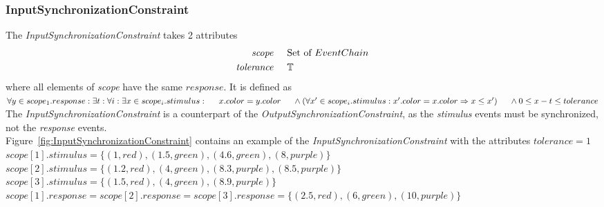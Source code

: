 	\subsubsection{InputSynchronizationConstraint}
	The \emph{InputSynchronizationConstraint} takes 2 attributes
	\begin{align*}
		\emph{scope} 	& \hspace{.5cm} \text{Set of }EventChain\\
		\emph{tolerance}& \hspace{.5cm} \mathbb{T}
	\end{align*}
	where all elements of \emph{scope} have the same $response$. It is defined as \\[10pt]
	\begin{math}
		\forall y\in scope_1.response: \exists t: \forall i: \exists x\in scope_i.stimulus:\\
		\text{\hspace{.5cm}} x.color = y.color\\
		\text{\hspace{.5cm}}\land (\forall x'\in scope_i.stimulus: x'.color=x.color \Rightarrow x\leq x')\\
		\text{\hspace{.5cm}}\land 0\leq x-t\leq tolerance
	\end{math}\\[10pt]
	The \emph{InputSynchronizationConstraint} is a counterpart of the \emph{OutputSynchronizationConstraint}, as the \emph{stimulus} events must be synchronized, not the \emph{response} events.\\
	Figure~\ref{fig:InputSynchronizationConstraint} contains an example of the \emph{InputSynchronizationConstraint} with the attributes $tolerance=1$\\
	$scope[1].stimulus=\{(1, red), (1.5, green), (4.6, green), (8, purple)\}$\\
	$scope[2].stimulus=\{(1.2, red), (4, green), (8.3, purple), (8.5, purple)\}$\\
	$scope[3].stimulus=\{(1.5, red), (4, green), (8.9, purple)\}$\\
	$scope[1].response=scope[2].response=scope[3].response=\{(2.5, red), (6, green), (10, purple)\}$\\
